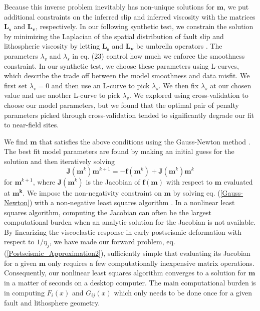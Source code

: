 Because this inverse problem inevitably has non-unique solutions for
$\mathbf{m}$, we put additional constraints on the inferred slip and
inferred viscosity with the matrices $\mathbf{L_s}$ and $\mathbf{L_v}$,
respectively.  In our following synthetic test, we constrain the
solution by minimizing the Laplacian of the spatial distribution of
fault slip and lithospheric viscosity by letting $\mathbf{L_s}$ and
$\mathbf{L_v}$ be umbrella operators \citep{Desbrun1999}.  The parameters
$\lambda_v$ and $\lambda_s$ in eq. (23) control how much we enforce
the smoothness constraint.  In our synthetic test, we choose these
parameters using L-curves, which describe the trade off between the
model smoothness and data misfit.  We first set $\lambda_v=0$ and then
use an L-curve to pick $\lambda_s$.  We then fix $\lambda_s$ at our
chosen value and use another L-curve to pick $\lambda_v$.  We explored
using cross-validation to choose our model parameters, but we found
that the optimal pair of penalty parameters picked through
cross-validation tended to significantly degrade our fit to near-field
sites.

We find $\mathbf{m}$ that satisfies the above conditions using the
Gauss-Newton method \citep[e.g.][]{Aster2011}.  The best fit model parameters are
found by making an initial guess for the solution and then iteratively
solving
\begin{equation}\label{Gauss-Newton}
\mathbf{J}(\mathbf{m}^{k})\mathbf{m}^{k+1} = -\mathbf{f}(\mathbf{m}^k) + \mathbf{J}(\mathbf{m}^{k})\mathbf{m}^{k}
\end{equation}
for $\mathbf{m}^{k+1}$, where $\mathbf{J}(\mathbf{m}^k)$ is the Jacobian
of $\mathbf{f(m)}$ with respect to $\mathbf{m}$ evaluated at
$\mathbf{m^k}$. We impose the non-negativity constraint on $\mathbf{m}$
by solving eq. (\ref{Gauss-Newton}) with a non-negative least squares
algorithm \citep{Lawson1995}. In a nonlinear least squares algorithm,
computing the Jacobian can often be the largest computational burden
when an analytic solution for the Jacobian is not available. By
linearizing the viscoelastic response in early postseismic deformation
with respect to $1/\eta_j$, we have made our forward problem,
eq. (\ref{Postseismic_Approximation2}), sufficiently simple that
evaluating its Jacobian for a given $\mathbf{m}$ only requires a few
computationally inexpensive matrix operations. Consequently, our
nonlinear least squares algorithm converges to a solution for
$\mathbf{m}$ in a matter of seconds on a desktop computer.  The main
computational burden is in computing $F_i(x)$ and $G_{ij}(x)$ which
only needs to be done once for a given fault and lithosphere geometry.

